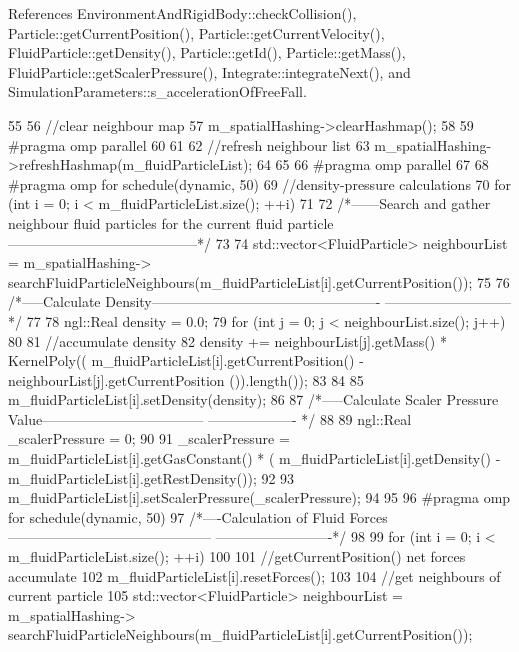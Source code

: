 References EnvironmentAndRigidBody::checkCollision(), Particle::getCurrentPosition(), Particle::getCurrentVelocity(), FluidParticle::getDensity(), Particle::getId(), Particle::getMass(), FluidParticle::getScalerPressure(), Integrate::integrateNext(), and SimulationParameters::s\_\-accelerationOfFreeFall.




\begin{DoxyCode}
55 {
56     //clear neighbour map
57     m_spatialHashing->clearHashmap();
58 
59 #pragma omp parallel
60 
61 {
62     //refresh neighbour list
63     m_spatialHashing->refreshHashmap(m_fluidParticleList);
64 }
65 
66 #pragma omp parallel
67 {
68 #pragma omp for schedule(dynamic, 50)
69     //density-pressure calculations
70     for (int i = 0; i < m_fluidParticleList.size(); ++i)
71     {
72         /*------Search and gather neighbour fluid particles for the current fluid
       particle-----------------------------------------*/
73 
74         std::vector<FluidParticle> neighbourList = m_spatialHashing->
      searchFluidParticleNeighbours(m_fluidParticleList[i].getCurrentPosition());
75 
76         /*-----Calculate Density-------------------------------------------------
      ---------------------------*/
77 
78         ngl::Real density = 0.0;
79         for (int j = 0; j < neighbourList.size(); j++)
80         {
81             //accumulate density
82             density += neighbourList[j].getMass() * KernelPoly((
      m_fluidParticleList[i].getCurrentPosition() - neighbourList[j].getCurrentPosition
      ()).length());
83         }
84 
85         m_fluidParticleList[i].setDensity(density);
86 
87         /*-----Calculate Scaler Pressure Value-----------------------------------
      ------------------- */
88 
89         ngl::Real _scalerPressure = 0;
90 
91         _scalerPressure = m_fluidParticleList[i].getGasConstant() * (
      m_fluidParticleList[i].getDensity() - m_fluidParticleList[i].getRestDensity());
92 
93         m_fluidParticleList[i].setScalerPressure(_scalerPressure);
94     }
95 
96 #pragma omp for schedule(dynamic, 50)
97     /*----Calculation of Fluid Forces--------------------------------------------
      -------------------------*/
98 
99     for (int i = 0; i < m_fluidParticleList.size(); ++i)
100     {
101         //getCurrentPosition() net forces accumulate
102         m_fluidParticleList[i].resetForces();
103 
104         //get neighbours of current particle
105         std::vector<FluidParticle> neighbourList = m_spatialHashing->
      searchFluidParticleNeighbours(m_fluidParticleList[i].getCurrentPosition());
}}}
\end{DoxyCode}
